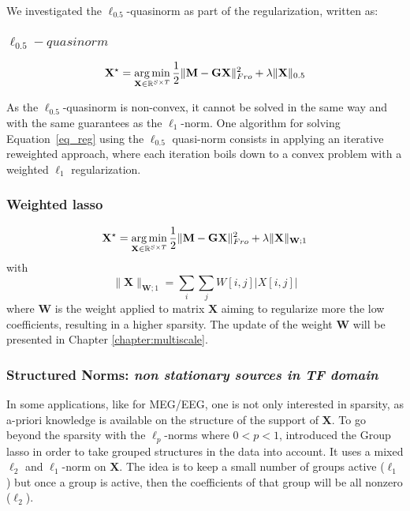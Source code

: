 We investigated the $\ell_{0.5}$-quasinorm as part of the regularization, written as:
\adjustwidth{1em}{0pt}
\subsubsection*{$\ell_{0.5}-quasinorm$}
\begin{equation} \label{eq_quasinorm}
	\mathbf{X}^\star = \mathop{\mathrm{arg}\,\mathrm{min}}_{\mathbf{X}\in\mathbb{R}^{S\times T}}\frac{1}{2}\|\mathbf{M}-\mathbf{GX}\|_{Fro}^2 + \lambda\|\mathbf{X}\|_{0.5}
\end{equation}
\endadjustwidth

As the $\ell_{0.5}$-quasinorm is non-convex, it cannot be solved in the same way and with the same guarantees as the $\ell_1$-norm. One algorithm for solving Equation~\eqref{eq_reg} using the $\ell_{0.5}$ quasi-norm consists in applying an iterative reweighted approach, where each iteration boils down to a convex problem with a weighted $\ell_1$ regularization.
\adjustwidth{1em}{0pt}

\subsubsection*{Weighted \ac{lasso}}
\begin{equation} \label{eq_wlasso}
	\mathbf{X}^\star = \mathop{\mathrm{arg}\,\mathrm{min}}_{\mathbf{X}\in\mathbb{R}^{S\times T}}\frac{1}{2}\|\mathbf{M}-\mathbf{GX}\|_{Fro}^2 + \lambda\|\mathbf{X}\|_{\mathbf{W};1}
\end{equation}
with
\begin{equation*}
	\|\mathbf{X}\|_{\mathbf{W};1}=\sum_i\sum_j W[i,j]|X[i,j]|
\end{equation*}
where $\mathbf{W}$ is the weight applied to matrix $\mathbf{X}$ aiming to regularize more the low coefficients, resulting in a higher sparsity. The update of the weight $\mathbf{W}$ will be presented in Chapter \ref{chapter:multiscale}.
\endadjustwidth

\subsubsection*{Structured Norms: \textit{non stationary sources in TF domain}}\label{sec:mixed_norms}
In some applications, like for MEG/EEG, one is not only interested in sparsity, as a-priori knowledge is available on the structure of the support of $\mathbf{X}$. To go beyond the sparsity with the $\ell_p$-norms where $0<p<1$, \cite{yuan2006model} introduced the Group \ac{lasso} in order to take grouped structures  in the data into account. It uses a mixed $\ell_2$ and $\ell_1$-norm on $\mathbf{X}$. The idea is to keep a small number of groups active ($\ell_1$) but once a group is active, then the coefficients of that group will be all nonzero ($\ell_2$).
\adjustwidth{1em}{0pt}
\vspace{-10pt}
